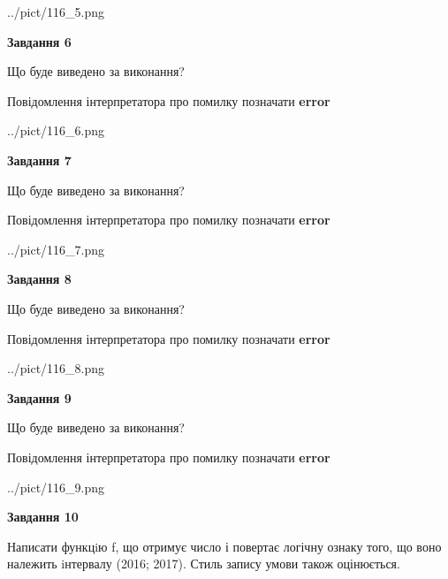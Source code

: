 \documentclass[12pt, ukrainian]{article}
\begin{document}
{\begin {large}
\begin{center}
	{../pict/116_5.png}
\end{center}
\newpage

{\begin {center}\textbf{Завдання 6}\end {center}}\par
Що буде виведено за виконання? \par
Повідомлення інтерпретатора про помилку позначати \textbf{error}

\begin{center}
	{../pict/116_6.png}
\end{center}
\newpage

{\begin {center}\textbf{Завдання 7}\end {center}}\par
Що буде виведено за виконання? \par
Повідомлення інтерпретатора про помилку позначати \textbf{error}

\begin{center}
	{../pict/116_7.png}
\end{center}
\newpage

{\begin {center}\textbf{Завдання 8}\end {center}}\par
Що буде виведено за виконання? \par
Повідомлення інтерпретатора про помилку позначати \textbf{error}

\begin{center}
	{../pict/116_8.png}
\end{center}
\newpage

{\begin {center}\textbf{Завдання 9}\end {center}}\par
Що буде виведено за виконання? \par
Повідомлення інтерпретатора про помилку позначати \textbf{error}

\begin{center}
	{../pict/116_9.png}
\end{center}
\newpage

{\begin {center}\textbf{Завдання 10}\end {center}}\par

Написати функцiю f, що отримує число і повертає логічну ознаку того, що воно належить iнтервалу (2016; 2017). Стиль запису умови також оцінюється.\par
\newpage

\end {large}}
\end{document}
